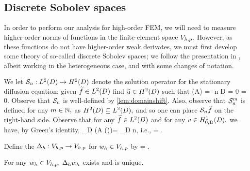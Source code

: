 \subsection{Discrete Sobolev spaces}\label{sec:discsob}
In order to perform our analysis for high-order FEM, we will need to measure higher-order norms of functions in the finite-element space $V_{h,p}.$ However, as these functions do not have higher-order weak derivates, we must first develop some theory of so-called discrete Sobolev spaces; we follow the presentation in \cite{DuWu:15}, albeit working in the heterogeneous case, and with some changes of notation.

We let $\DeltaAI:\LtD\rightarrow\HtD$ denote the solution operator for the stationary diffusion equation: given $\ftilde \in \LtD$ find $\utilde \in \HtD$ such that
\beq\label{eq:sdeq}
\grad \cdot \mleft(A\grad \utilde\mright) = -n\ftilde {} D
\eeq
\beq\label{eq:sddbc}
\trD \utilde = 0
\eeq
\beq\label{eq:sdnbc}
\dn \utilde = 0.
\eeq
Observe that $\mathcal S_{n}$ is well-defined by \cref{lem:domainshift}. Also, observe that $\mathcal S_{n}^{m}$ is defined for any $m \in \mathbb N,$ as $\HtD \subseteq \LtD,$ and so one can place $\mathcal S_{n} \widetilde{f}$ on the right-hand side. 
Observe that for any $\ftilde \in \LtD$ and for any $v \in \HozDD,$ we have, by Green's identity,
\beqs
\int_D \mleft(A \grad \mleft(\DeltaAI\ftilde\mright)\mright)\cdot \grad \vb = \int_D n\ftilde \vb,
\eeqs
i.e.,
\beq\label{eq:deltaagreen}
 = .
\eeq
{}

Define the  $\Delta_{h}:V_{h,p}\rightarrow V_{h,p}$ for $w_{h} \in V_{h,p}$ by
\beq\label{eq:discderdef}
\IPLtDn{\Deltah \wh}{\vh} =  \tforall \vh \in \Vhp.
\eeq
\ede

\label{lem:ddwd}
For any $w_{h} \in V_{h,p},$ $\Delta_{h} w_{h}$ exists and is unique.
\ele

